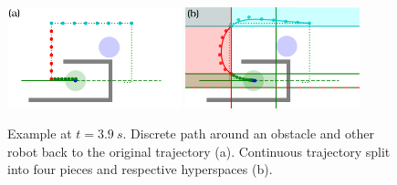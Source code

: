 \documentclass{svproc}
\begin{document}
\begin{figure}
\centering
\includegraphics[width=0.45\textwidth]{images/swap2_discrete.pdf}
\hfill
\includegraphics[width=0.45\textwidth]{images/swap2_cont_red.pdf}
\caption{
Example at $t=\SI{3.9}{s}$.
Discrete path around an obstacle and other robot back to the original trajectory (a).
Continuous trajectory split into four pieces and respective hyperspaces (b).
}
\label{fig:swap2_2}
\end{figure}

\end{document}
